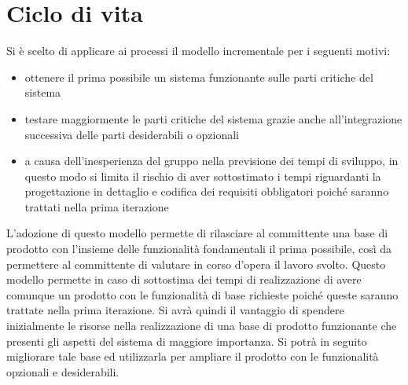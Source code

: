 \section{Ciclo di vita}{
	Si è scelto di applicare ai processi il modello incrementale per i seguenti motivi:
	\begin{itemize}
		\item ottenere il prima possibile un sistema funzionante sulle parti critiche del sistema
		\item testare maggiormente le parti critiche del sistema grazie anche all'integrazione successiva delle parti desiderabili o opzionali
		\item a causa dell'inesperienza del gruppo nella previsione dei tempi di sviluppo, in questo modo si limita il rischio di aver sottostimato i tempi riguardanti la progettazione in dettaglio e codifica dei requisiti obbligatori poiché saranno trattati nella prima iterazione
	\end{itemize}
	L'adozione di questo modello permette di rilasciare al committente una base di prodotto con l'insieme delle funzionalità fondamentali il prima possibile, così da permettere al committente di valutare in corso d'opera il lavoro svolto. 
	Questo modello permette in caso di sottostima dei tempi di realizzazione di avere comunque un prodotto con le funzionalità di base richieste poiché queste saranno trattate nella prima iterazione.
	Si avrà quindi il vantaggio di spendere inizialmente le risorse nella realizzazione di una base di prodotto funzionante che presenti gli aspetti del sistema di maggiore importanza. 
	Si potrà in seguito migliorare tale base ed utilizzarla per ampliare il prodotto con le funzionalità opzionali e desiderabili.
}


